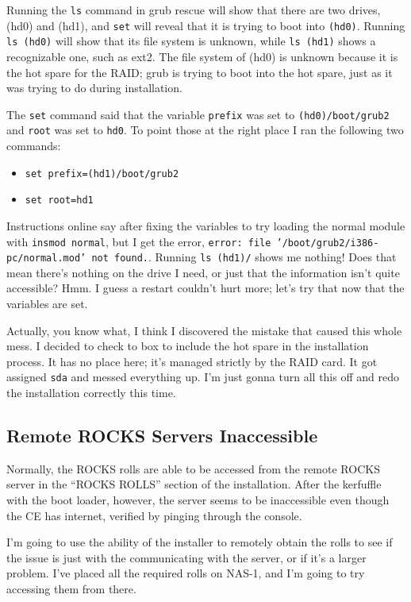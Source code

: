 \documentclass[12pt]{article}
\begin{document}
\qq Running the {\tt ls} command in grub rescue will show that there are two
drives, (hd0) and (hd1), and {\tt set} will reveal that it is trying to boot into
{\tt (hd0)}. Running {\tt ls (hd0)} will show that its file system is unknown,
while {\tt ls (hd1)} shows a recognizable one, such as ext2. The file system of
(hd0) is unknown because it is the hot spare for the RAID; grub is trying to
boot into the hot spare, just as it was trying to do during installation.

\qq The {\tt set} command said that the variable {\tt prefix} was set to
{\tt (hd0)/boot/grub2} and {\tt root} was set to {\tt hd0}. To point those at the
right place I ran the following two commands:

\begin{itemize}
  \item {\tt set prefix=(hd1)/boot/grub2}
  \item {\tt set root=hd1}
\end{itemize}

\qq Instructions online say after fixing the variables to try loading the normal
module with {\tt insmod normal}, but I get the error, {\tt error: file
  '/boot/grub2/i386-pc/normal.mod' not found.}. Running {\tt ls (hd1)/} shows me
nothing! Does that mean there's nothing on the drive I need, or just that the
information isn't quite accessible? Hmm. I guess a restart couldn't hurt more;
let's try that now that the variables are set.

\qq Actually, you know what, I think I discovered the mistake that caused this
whole mess. I decided to check to box to include the hot spare in the
installation process. It has no place here; it's managed strictly by the RAID
card. It got assigned {\tt sda} and messed everything up. I'm just gonna turn all
this off and redo the installation correctly this time.

\subsection{Remote ROCKS Servers Inaccessible}

\qq Normally, the ROCKS rolls are able to be accessed from the remote ROCKS
server in the ``ROCKS ROLLS'' section of the installation. After the kerfuffle
with the boot loader, however, the server seems to be inaccessible even though
the CE has internet, verified by pinging through the console.

\qq I'm going to use the ability of the installer to remotely obtain the rolls
to see if the issue is just with the communicating with the server, or if it's a
larger problem. I've placed all the required rolls on NAS-1, and I'm going to
try accessing them from there.
\end{document}
